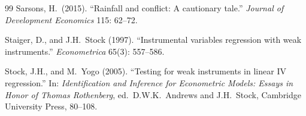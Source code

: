 \documentclass[11pt,a4paper]{article}
\begin{document}
\begin{thebibliography}{99}
Sarsons, H.\ (2015). ``Rainfall and conflict: A cautionary tale.''
  \emph{Journal of Development Economics} 115: 62--72.

Staiger, D., and J.H.\ Stock (1997). ``Instrumental variables
  regression with weak instruments.'' \emph{Econometrica} 65(3):
  557--586.

Stock, J.H., and M.\ Yogo (2005). ``Testing for weak instruments in
  linear IV regression.'' In: \emph{Identification and Inference for
  Econometric Models: Essays in Honor of Thomas Rothenberg}, ed.\
  D.W.K.\ Andrews and J.H.\ Stock, Cambridge University Press,
  80--108.

\end{thebibliography}
\end{document}
